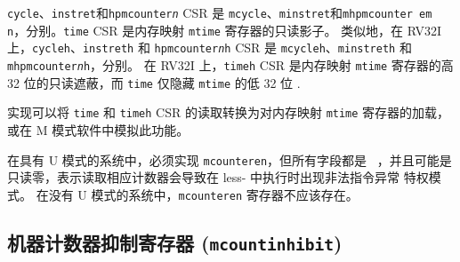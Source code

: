 {\tt cycle}、{\tt instret}和{\tt hpmcounter{\em n}} CSR 是 {\tt mcycle}、{\tt minstret}和{\tt mhpmcounter{\ em n}}，分别。{\tt time} CSR 是内存映射 {\tt mtime} 寄存器的只读影子。 类似地，在 RV32I 上，{\tt cycleh}、{\tt instreth} 和 {\tt hpmcounter{\em n}h} CSR 是 {\tt mcycleh}、{\tt minstreth} 和 {\tt mhpmcounter{\em n}h}，分别。 在 RV32I 上，{\tt timeh} CSR 是内存映射 {\tt mtime} 寄存器的高 32 位的只读遮蔽，而 {\tt time} 仅隐藏 {\tt mtime} 的低 32 位 .

\iffalse
\begin{commentary}
Implementations can convert reads of the {\tt time} and {\tt timeh} CSRs
into loads to the memory-mapped {\tt mtime} register, or emulate this
functionality in M-mode software.
\end{commentary}
\fi

\begin{commentary}
实现可以将 {\tt time} 和 {\tt timeh} CSR 的读取转换为对内存映射 {\tt mtime} 寄存器的加载，或在 M 模式软件中模拟此功能。
\end{commentary}

\iffalse
In systems with U-mode, the {\tt mcounteren} must be implemented, but all
fields are \warl\ and may be read-only zero,
indicating reads to the corresponding counter will
cause an illegal instruction exception when executing in a less-privileged mode.
In systems without U-mode, the {\tt mcounteren} register should not exist.
\fi

在具有 U 模式的系统中，必须实现 {\tt mcounteren}，但所有字段都是 \warl\ ，并且可能是只读零，表示读取相应计数器会导致在 less- 中执行时出现非法指令异常 特权模式。 在没有 U 模式的系统中，{\tt mcounteren} 寄存器不应该存在。

\subsection{机器计数器抑制寄存器 ({\tt mcountinhibit})}

